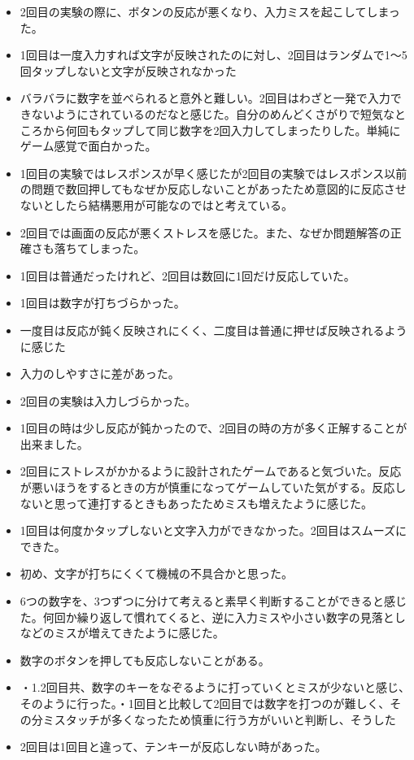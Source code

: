 \begin{itemize}
  \item 2回目の実験の際に、ボタンの反応が悪くなり、入力ミスを起こしてしまった。
  \item 1回目は一度入力すれば文字が反映されたのに対し、2回目はランダムで1〜5回タップしないと文字が反映されなかった
  \item バラバラに数字を並べられると意外と難しい。2回目はわざと一発で入力できないようにされているのだなと感じた。自分のめんどくさがりで短気なところから何回もタップして同じ数字を2回入力してしまったりした。単純にゲーム感覚で面白かった。
  \item 1回目の実験ではレスポンスが早く感じたが2回目の実験ではレスポンス以前の問題で数回押してもなぜか反応しないことがあったため意図的に反応させないとしたら結構悪用が可能なのではと考えている。
  \item 2回目では画面の反応が悪くストレスを感じた。また、なぜか問題解答の正確さも落ちてしまった。
  \item 1回目は普通だったけれど、2回目は数回に1回だけ反応していた。
  \item 1回目は数字が打ちづらかった。
  \item 一度目は反応が鈍く反映されにくく、二度目は普通に押せば反映されるように感じた
  \item 入力のしやすさに差があった。
  \item 2回目の実験は入力しづらかった。
  \item 1回目の時は少し反応が鈍かったので、2回目の時の方が多く正解することが出来ました。
  \item 2回目にストレスがかかるように設計されたゲームであると気づいた。反応が悪いほうをするときの方が慎重になってゲームしていた気がする。反応しないと思って連打するときもあったためミスも増えたように感じた。
  \item 1回目は何度かタップしないと文字入力ができなかった。2回目はスムーズにできた。
  \item 初め、文字が打ちにくくて機械の不具合かと思った。
  \item 6つの数字を、3つずつに分けて考えると素早く判断することができると感じた。何回か繰り返して慣れてくると、逆に入力ミスや小さい数字の見落としなどのミスが増えてきたように感じた。
  \item 数字のボタンを押しても反応しないことがある。
  \item ・1.2回目共、数字のキーをなぞるように打っていくとミスが少ないと感じ、そのように行った。・1回目と比較して2回目では数字を打つのが難しく、その分ミスタッチが多くなったため慎重に行う方がいいと判断し、そうした
  \item 2回目は1回目と違って、テンキーが反応しない時があった。

\end{itemize}

